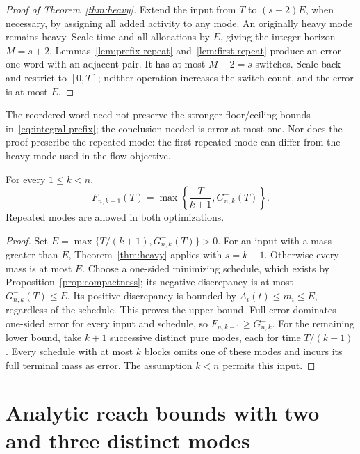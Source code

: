 \begin{proof}[Proof of Theorem~\ref{thm:heavy}]
Extend the input from $T$ to $(s+2)E$, when necessary, by assigning all
added activity to any mode. An originally heavy mode remains heavy.
Scale time and all allocations by $E$, giving the integer horizon
$M=s+2$. Lemmas~\ref{lem:prefix-repeat} and~\ref{lem:first-repeat}
produce an error-one word with an adjacent pair. It has at most $M-2=s$
switches. Scale back and restrict to $[0,T]$; neither operation increases
the switch count, and the error is at most $E$.
\end{proof}

The reordered word need not preserve the stronger floor/ceiling bounds
in~\eqref{eq:integral-prefix}; the conclusion needed is error at most one.
Nor does the proof prescribe the repeated mode: the first repeated mode
can differ from the heavy mode used in the flow objective.

\begin{theorem}\label{thm:one-sided-reduction}
For every $1\le k<n$,
\begin{equation}\label{eq:one-sided-reduction}
 F_{n,k-1}(T)=\max\left\{\frac{T}{k+1},G^-_{n,k}(T)\right\}.
\end{equation}
Repeated modes are allowed in both optimizations.
\end{theorem}
\begin{proof}
Set $E=\max\{T/(k+1),G^-_{n,k}(T)\}>0$. For an input with a mass
greater than $E$, Theorem~\ref{thm:heavy} applies with $s=k-1$. Otherwise
every mass is at most $E$. Choose a one-sided minimizing schedule, which
exists by Proposition~\ref{prop:compactness}; its negative discrepancy is
at most $G^-_{n,k}(T)\le E$. Its positive discrepancy is bounded by
$A_i(t)\le m_i\le E$, regardless of the schedule. This proves the upper
bound. Full error dominates one-sided error for every input and schedule,
so $F_{n,k-1}\ge G^-_{n,k}$. For the remaining lower bound, take $k+1$
successive distinct pure modes, each for time $T/(k+1)$. Every schedule
with at most $k$ blocks omits one of these modes and incurs its full
terminal mass as error. The assumption $k<n$ permits this input.
\end{proof}

\section{Analytic reach bounds with two and three distinct modes}\label{sec:reach-three}

